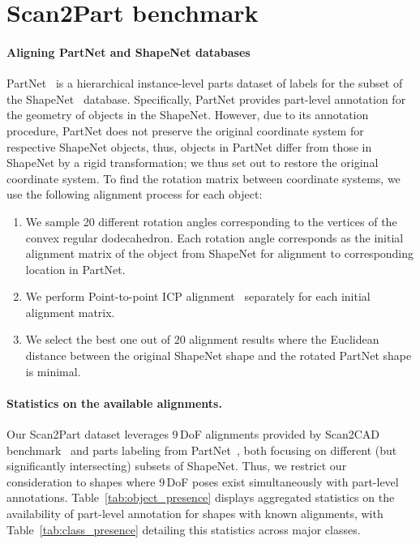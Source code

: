 \section{Scan2Part benchmark}
\label{supsec:scan2part-dataset-detail}



\paragraph{Aligning PartNet and ShapeNet databases}
\label{dataset:processing-detail}
PartNet~\cite{mo2019partnet} is a hierarchical instance-level parts dataset of labels for the subset of the ShapeNet~\cite{chang2015shapenet} database.
Specifically, PartNet provides part-level annotation for the geometry of objects in the ShapeNet.
However, due to its annotation procedure, PartNet does not preserve the original coordinate system for respective ShapeNet objects, thus, objects in PartNet differ from those in ShapeNet by a rigid transformation; we thus set out to restore the original coordinate system.
To find the rotation matrix between coordinate systems, we use the following alignment process for each object:
\begin{enumerate}
    \item We sample 20 different rotation angles corresponding to the vertices of the convex regular dodecahedron.
    Each rotation angle corresponds as the initial alignment matrix of the object from ShapeNet for alignment to corresponding location in PartNet.
    \item We perform Point-to-point ICP alignment~\cite{besl1992method} separately for each initial alignment matrix.
    \item We select the best one out of 20 alignment results where the Euclidean distance between the original ShapeNet shape and the rotated PartNet shape is minimal.
\end{enumerate}



\paragraph{Statistics on the available alignments. }
\label{dataset:alignments-statistics}
Our Scan2Part dataset leverages 9\,DoF alignments provided by Scan2CAD benchmark~\cite{avetisyan2019scan2cad} and parts labeling from PartNet~\cite{mo2019partnet}, both focusing on different (but significantly intersecting) subsets of ShapeNet.
Thus, we restrict our consideration to shapes where 9\,DoF poses exist simultaneously with part-level annotations.
Table~\ref{tab:object_presence} displays aggregated statistics on the availability of part-level annotation for shapes with known alignments, with Table~\ref{tab:class_presence} detailing this statistics across major classes.

